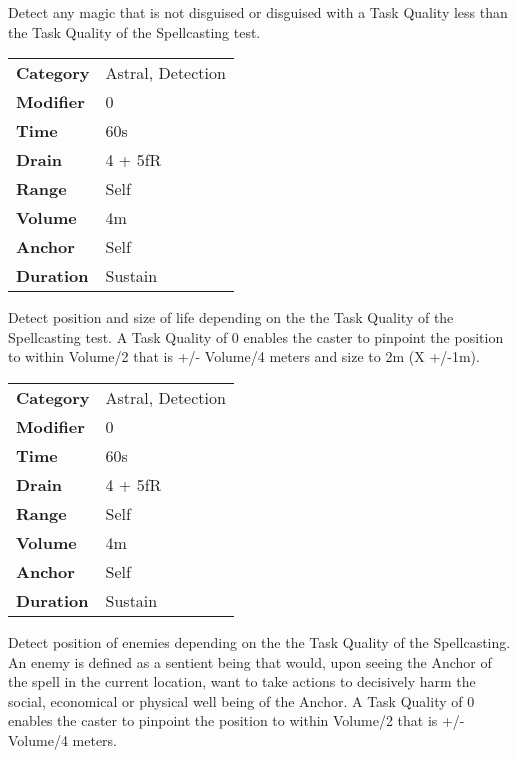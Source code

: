 \hfil

Detect any magic that is not disguised or disguised with a Task
Quality less than the Task
Quality of the
Spellcasting test.


\begin{tabular}{ll}
    \textbf{Category} & Astral, Detection \\
    \textbf{Modifier} & 0                 \\
    \textbf{Time}     & 60s               \\
    \textbf{Drain}    & 4 + 5fR           \\
    \textbf{Range}    & Self              \\
    \textbf{Volume}   & 4m                \\
    \textbf{Anchor}   & Self              \\
    \textbf{Duration} & Sustain           \\
\end{tabular}

\hfil

Detect position and size of life depending on the the Task
Quality of the
Spellcasting test. A Task
Quality of 0 enables the caster to pinpoint
the position to within Volume/2 that is +/-
Volume/4 meters and size to 2m (X +/-1m).



\begin{tabular}{ll}
    \textbf{Category} & Astral, Detection \\
    \textbf{Modifier} & 0                 \\
    \textbf{Time}     & 60s               \\
    \textbf{Drain}    & 4 + 5fR           \\
    \textbf{Range}    & Self              \\
    \textbf{Volume}   & 4m                \\
    \textbf{Anchor}   & Self              \\
    \textbf{Duration} & Sustain           \\
\end{tabular}

\hfil

Detect position of enemies depending on the the Task
Quality of the
Spellcasting. An enemy is defined as a
sentient being that would, upon seeing the Anchor
of the spell in the current location, want to take actions to decisively
harm the social, economical or physical well being of the
Anchor. A Task Quality
of 0 enables the caster to pinpoint the position to within
Volume/2 that is +/- Volume/4
meters.


